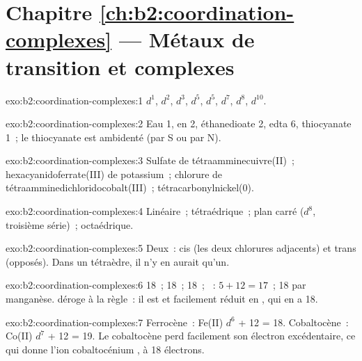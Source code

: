 \section*{Chapitre \ref{ch:b2:coordination-complexes} --- Métaux de transition et complexes}

\begin{solution}{exo:b2:coordination-complexes:1}
 $d^1$,  $d^2$,  $d^3$,  $d^5$,  $d^5$, 
$d^7$,  $d^8$,  $d^{10}$.
\end{solution}

\begin{solution}{exo:b2:coordination-complexes:2}
Eau 1, en 2, éthanedioate 2, edta 6, thiocyanate 1~; le thiocyanate est ambidenté
(par S ou par N).
\end{solution}

\begin{solution}{exo:b2:coordination-complexes:3}
Sulfate de tétraamminecuivre(II)~; hexacyanidoferrate(III) de potassium~;
chlorure de tétraamminedichloridocobalt(III)~; tétracarbonylnickel(0).
\end{solution}

\begin{solution}{exo:b2:coordination-complexes:4}
Linéaire~; tétraédrique~; plan carré ($d^8$, troisième série)~; octaédrique.
\end{solution}

\begin{solution}{exo:b2:coordination-complexes:5}
Deux~: cis (les deux chlorures adjacents) et trans (opposés). Dans un tétraèdre, il n'y en
aurait qu'un.
\end{solution}

\begin{solution}{exo:b2:coordination-complexes:6}
 18~;  18~;  18~; ~: $5 + 12 = 17$~;
 18 par manganèse.  déroge à la règle~: il est  et
facilement réduit en \ce{[V(CO)6]-}, qui en a 18.
\end{solution}

\begin{solution}{exo:b2:coordination-complexes:7}
Ferrocène~: Fe(II) $d^6$ + 12 = 18. Cobaltocène~: Co(II) $d^7$ + 12 = 19. Le cobaltocène perd
facilement son électron excédentaire, ce qui donne l'ion cobaltocénium \ce{[Co(C5H5)2]+}, à 18 électrons.
\end{solution}

